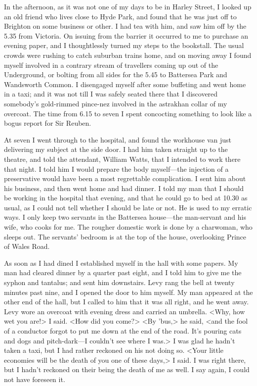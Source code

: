 In the afternoon, as it was not one of my days to be in Harley Street, I looked up an old friend who lives close to Hyde Park, and found that he was just off to Brighton on some business or other. I had tea with him, and saw him off by the 5.35 from Victoria. On issuing from the barrier it occurred to me to purchase an evening paper, and I thoughtlessly turned my steps to the bookstall. The usual crowds were rushing to catch suburban trains home, and on moving away I found myself involved in a contrary stream of travellers coming up out of the Underground, or bolting from all sides for the 5.45 to Battersea Park and Wandsworth Common. I disengaged myself after some buffeting and went home in a taxi; and it was not till I was safely seated there that I discovered somebody's gold-rimmed pince-nez involved in the astrakhan collar of my overcoat. The time from 6.15 to seven I spent concocting something to look like a bogus report for Sir Reuben.

At seven I went through to the hospital, and found the workhouse van just delivering my subject at the side door. I had him taken straight up to the theatre, and told the attendant, William Watts, that I intended to work there that night. I told him I would prepare the body myself—the injection of a preservative would have been a most regrettable complication. I sent him about his business, and then went home and had dinner. I told my man that I should be working in the hospital that evening, and that he could go to bed at 10.30 as usual, as I could not tell whether I should be late or not. He is used to my erratic ways. I only keep two servants in the Battersea house—the man-servant and his wife, who cooks for me. The rougher domestic work is done by a charwoman, who sleeps out. The servants' bedroom is at the top of the house, overlooking Prince of Wales Road.

As soon as I had dined I established myself in the hall with some papers. My man had cleared dinner by a quarter past eight, and I told him to give me the syphon and tantalus; and sent him downstairs. Levy rang the bell at twenty minutes past nine, and I opened the door to him myself. My man appeared at the other end of the hall, but I called to him that it was all right, and he went away. Levy wore an overcoat with evening dress and carried an umbrella. <Why, how wet you are!> I said. <How did you come?> <By 'bus,> he said, <and the fool of a conductor forgot to put me down at the end of the road. It's pouring cats and dogs and pitch-dark—I couldn't see where I was.> I was glad he hadn't taken a taxi, but I had rather reckoned on his not doing so. <Your little economies will be the death of you one of these days,> I said. I was right there, but I hadn't reckoned on their being the death of me as well. I say again, I could not have foreseen it.

